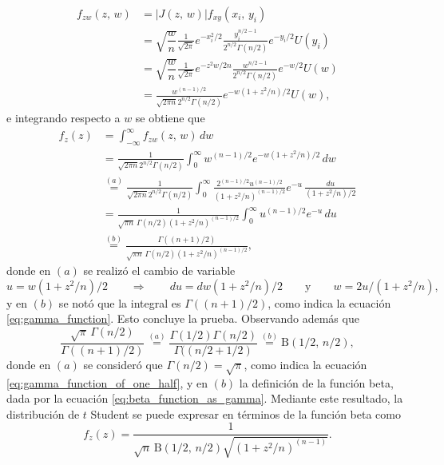 \documentclass[a4paper]{report}
\begin{document}
\begin{align*}
 f_{zw}(z,\,w)&=|J(z,\,w)|f_{xy}(x_i,\,y_i)\\
   &=\sqrt{\dfrac{w}{n}}\frac{1}{\sqrt{2\pi}}e^{-x_i^2/2}\frac{y_i^{n/2-1}}{2^{n/2}\Gamma(n/2)}e^{-y_i/2}U(y_i)\\
   &=\sqrt{\dfrac{w}{n}}\frac{1}{\sqrt{2\pi}}e^{-z^2w/2n}\frac{w^{n/2-1}}{2^{n/2}\Gamma(n/2)}e^{-w/2}U(w)\\
   &=\frac{w^{(n-1)/2}}{\sqrt{2\pi n}2^{n/2}\Gamma(n/2)}e^{-w(1+z^2/n)/2}U(w),
\end{align*}
e integrando respecto a \(w\) se obtiene que
\begin{align*}
 f_z(z)&=\int_{-\infty}^\infty f_{zw}(z,\,w)\,dw\\
  &=\frac{1}{\sqrt{2\pi n}2^{n/2}\Gamma(n/2)}\int_0^\infty w^{(n-1)/2}e^{-w(1+z^2/n)/2}\,dw\\
  &\overset{(a)}{=}\frac{1}{\sqrt{2\pi n}2^{n/2}\Gamma(n/2)}\int_0^\infty \frac{2^{(n-1)/2}u^{(n-1)/2}}{(1+z^2/n)^{(n-1)/2}}e^{-u}\,\frac{du}{(1+z^2/n)/2}\\
  &=\frac{1}{\sqrt{\pi n}\,\Gamma(n/2)(1+z^2/n)^{(n-1)/2}}\int_0^\infty u^{(n-1)/2}e^{-u}\,du\\
  &\overset{(b)}{=}\frac{\Gamma((n+1)/2)}{\sqrt{\pi n}\,\Gamma(n/2)(1+z^2/n)^{(n-1)/2}},
\end{align*}
donde en \((a)\) se realizó el cambio de variable 
\[
 u=w(1+z^2/n)/2\qquad\Rightarrow\qquad du=dw(1+z^2/n)/2\qquad\textrm{y}\qquad w=2u/(1+z^2/n),
\]
y en \((b)\) se notó que la integral es \(\Gamma((n+1)/2)\), como indica la ecuación \ref{eq:gamma_function}. Esto concluye la prueba.
Observando además que 
\[
 \frac{\sqrt{\pi}\,\Gamma(n/2)}{\Gamma((n+1)/2)}\overset{(a)}{=}\frac{\Gamma(1/2)\Gamma(n/2)}{\Gamma((n/2+1/2)}\overset{(b)}{=}\mathrm{B}(1/2,\,n/2),
\]
donde en \((a)\) se consideró que \(\Gamma(n/2)=\sqrt{\pi}\), como indica la ecuación \ref{eq:gamma_function_of_one_half}, y en \((b)\) la definición de la función beta, dada por la ecuación \ref{eq:beta_function_as_gamma}. Mediante este resultado, la distribución de \(t\) Student se puede expresar en términos de la función beta como
\[
 f_z(z)=\frac{1}{\sqrt{n}\,\mathrm{B}(1/2,\,n/2)\sqrt{(1+z^2/n)^{(n-1)}}}.
\]
\end{document}
